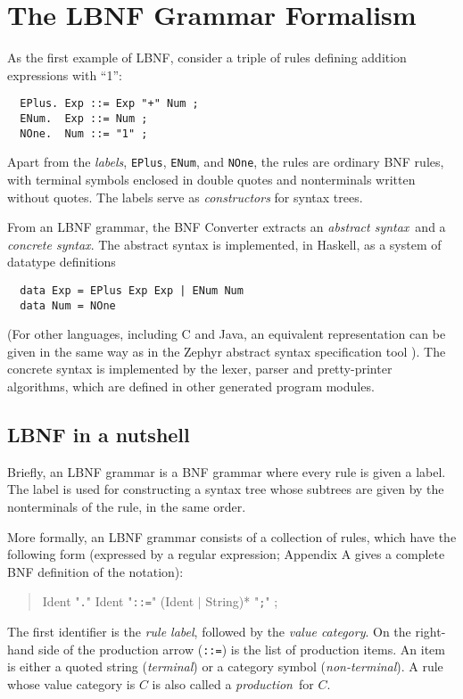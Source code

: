 \documentclass[10pt]{article}
\newcommand{\bequ}{\begin{quote}}
\newcommand{\enqu}{\end{quote}}
\begin{document}
\section{The LBNF Grammar Formalism}

As the first example of LBNF,
consider a triple of rules defining addition expressions with ``1'':
\begin{verbatim}
  EPlus. Exp ::= Exp "+" Num ;
  ENum.  Exp ::= Num ;
  NOne.  Num ::= "1" ;
\end{verbatim}
Apart from the \textit{labels}, {\tt EPlus}, {\tt ENum}, and {\tt NOne},
the rules are
ordinary BNF rules, with terminal symbols enclosed in
double quotes and nonterminals written without quotes.
The labels serve as \textit{constructors} for
syntax trees.

From an LBNF grammar, the BNF Converter extracts
an \textit{abstract syntax}\ and
a \textit{concrete syntax}.
The abstract syntax is implemented, in Haskell, as a system of
datatype definitions
\begin{verbatim}
  data Exp = EPlus Exp Exp | ENum Num
  data Num = NOne
\end{verbatim}
(For other languages, including C and Java, an equivalent
representation can be given in the same way as in the Zephyr
abstract syntax specification tool \cite{zephyr}).
The concrete syntax is implemented by the
lexer, parser and pretty-printer algorithms,
which are defined in other generated program modules.



\subsection{LBNF in a nutshell}

Briefly, an LBNF grammar is a BNF grammar where every rule is given a label.
The label is used for constructing a syntax tree whose subtrees are
given by the nonterminals of the rule, in the same order.

More formally, an LBNF grammar consists of a collection of rules,
which have the following form (expressed by a regular expression;
Appendix A gives a complete BNF definition of the notation):
\bequ
  Ident "{\tt .}" Ident "{\tt ::=}" (Ident $\mid$ String)* "{\tt;}" ;
\enqu
The first identifier is the \textit{rule label}, followed by the
\textit{value category}. On the right-hand side of the production
arrow ({\tt ::=}) is the list of production items. An item is either
a quoted string (\textit{terminal}) or a category symbol (\textit{non-terminal}).
A rule whose value category is $C$ is also called a \textit{production}\ for $C$.
\end{document}
